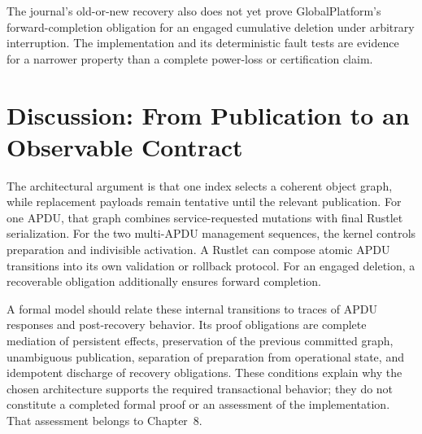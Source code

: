 The journal's old-or-new recovery also does not yet prove GlobalPlatform's
forward-completion obligation for an engaged cumulative deletion under
arbitrary interruption. The implementation and its deterministic fault tests
are evidence for a narrower property than a complete power-loss or
certification claim.

\section{Discussion: From Publication to an Observable Contract}

The architectural argument is that one index selects a coherent object graph,
while replacement payloads remain tentative until the relevant publication.
For one APDU, that graph combines service-requested mutations with final
Rustlet serialization. For the two multi-APDU management sequences, the kernel controls preparation
and indivisible activation. A Rustlet can compose atomic APDU transitions
into its own validation or rollback protocol. For an engaged
deletion, a recoverable obligation additionally ensures forward completion.

A formal model should relate these internal transitions to traces of APDU
responses and post-recovery behavior. Its proof obligations are complete
mediation of persistent effects, preservation of the previous committed graph,
unambiguous publication, separation of preparation from operational state,
and idempotent discharge of recovery obligations. These conditions explain
why the chosen architecture supports the required transactional behavior;
they do not constitute a completed formal proof or an assessment of the
implementation. That assessment belongs to Chapter~8.
